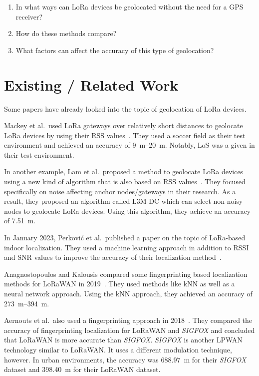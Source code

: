 
\begin{enumerate}
      \item In what ways can \ac{LoRa} devices be geolocated without the need for a \ac{GPS} receiver?
      \item How do these methods compare?
      \item What factors can affect the accuracy of this type of geolocation?
\end{enumerate}

\section{Existing / Related Work}\label{sec:related-work}

Some papers have already looked into the topic of geolocation of \ac{LoRa} devices.

Mackey et al.~used \ac{LoRa} gateways over relatively short distances to geolocate \ac{LoRa} devices by using their \ac{RSS} values~\cite{mackey_lora-based_2019}.
They used a soccer field as their test environment and achieved an accuracy of \SIrange{9}{20}{\meter}.
Notably, \ac{LoS} was a given in their test environment.

In another example, Lam et al.~proposed a method to geolocate \ac{LoRa} devices using a new kind of algorithm that is also based on \ac{RSS} values~\cite{lam_new_2018}.
They focused specifically on noise affecting anchor nodes/gateways in their research.
As a result, they proposed an algorithm called \acf{L3M-DC} which can select non-noisy nodes to geolocate \ac{LoRa} devices.
Using this algorithm, they achieve an accuracy of \SI{7.51}{\meter}.

In January 2023, Perković et al.\ published a paper on the topic of \ac{LoRa}-based indoor localization.
They used a machine learning approach in addition to \ac{RSSI} and \ac{SNR} values to improve the accuracy of their localization method~\cite{perkovic_machine_2023}.

Anagnostopoulos and Kalousis compared some fingerprinting based localization methods for \ac{LoRaWAN} in 2019~\cite{anagnostopoulos_reproducible_2019}.
They used methods like \ac{kNN} as well as a neural network approach.
Using the \ac{kNN} approach, they achieved an accuracy of \SIrange{273}{394}{\meter}.

Aernouts et al.\ also used a fingerprinting approach in 2018~\cite{aernouts_sigfox_2018}.
They compared the accuracy of fingerprinting localization for \ac{LoRaWAN} and \emph{SIGFOX} and concluded that \ac{LoRaWAN} is more accurate than \emph{SIGFOX}.
\emph{SIGFOX} is another \ac{LPWAN} technology similar to \ac{LoRaWAN}.
It uses a different modulation technique, however.
In urban environments, the accuracy was \SI{688.97}{\meter} for their \emph{SIGFOX} dataset and \SI{398.40}{\meter} for their LoRaWAN dataset.

